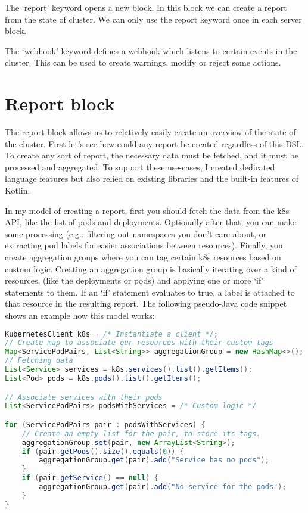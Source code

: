 The `report' keyword opens a new block. In this block we can create a report from the state of cluster. We can only use the report keyword once in each server block.

The `webhook' keyword defines a webhook which listens to certain events in the cluster. This can be used to create warnings, modify or reject some actions.

\section{Report block}

The report block allows us to relatively easily create an overview of the state of the cluster. First let's see how could any report be created regardless of this DSL. To create any sort of report, the necessary data must be fetched, and it must be processed and aggregated. To support these use-cases, I created dedicated language features but also relied on existing libraries and the built-in features of Kotlin.

In my model of creating a report, first you should fetch the data from the k8s API, like the list of pods and deployments. Optionally after that, you can make some processing (e.g.: filtering out namespaces you don't care about, or extracting pod labels for easier associations between resources). Finally, you create aggregation groups where you can tag certain k8s resources based on custom logic. Creating an aggregation group is basically iterating over a kind of resources, (like the deployments or pods) and applying one or more `if' statements to them. If an `if' statement evaluates to true, a label is attached to that resource in the resulting report. The following pseudo-Java code snippet shows an example how this model works:

\begin{lstlisting}[caption={Example report in pseudo-Java},language=Java,label=code:pseudo_report]
KubernetesClient k8s = /* Instantiate a client */;
// Create map to associate our resources with their custom tags
Map<ServicePodPairs, List<String>> aggregationGroup = new HashMap<>();
// Fetching data
List<Service> services = k8s.services().list().getItems();
List<Pod> pods = k8s.pods().list().getItems();

// Associate services with their pods
List<ServicePodPairs> podsWithServices = /* Custom logic */

for (ServicePodPairs pair : podsWithServices) {
    // Create an empty list for the pair, to store its tags.
    aggregationGroup.set(pair, new ArrayList<String>);
    if (pair.getPods().size().equals(0)) {
        aggregationGroup.get(pair).add("Service has no pods");
    }
    if (pair.getService() == null) {
        aggregationGroup.get(pair).add("No service for the pods");
    }
}
\end{lstlisting}

